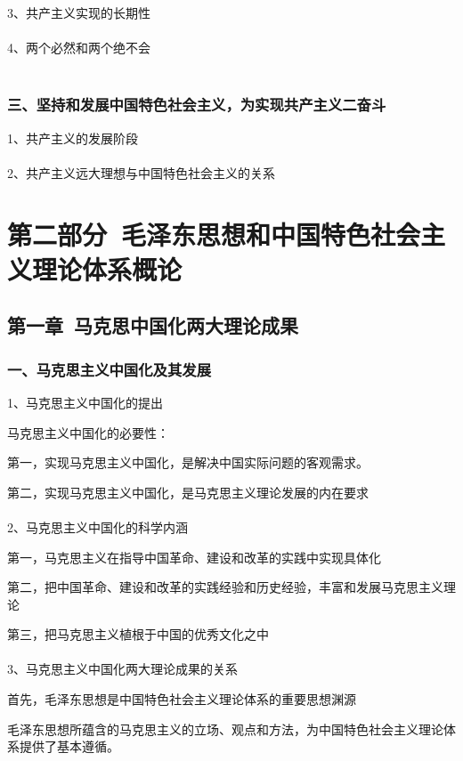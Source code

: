\documentclass{ctexart}
\begin{document}
3、共产主义实现的长期性
\\\\

4、两个必然和两个绝不会
\\\\

\subsubsection{三、坚持和发展中国特色社会主义，为实现共产主义二奋斗}
1、共产主义的发展阶段
\\\\

2、共产主义远大理想与中国特色社会主义的关系





\section{第二部分\ 毛泽东思想和中国特色社会主义理论体系概论}
\subsection{第一章\ 马克思中国化两大理论成果}
\subsubsection{一、马克思主义中国化及其发展}
1、马克思主义中国化的提出

马克思主义中国化的必要性：

第一，实现马克思主义中国化，是解决中国实际问题的客观需求。

第二，实现马克思主义中国化，是马克思主义理论发展的内在要求
\\\\

2、马克思主义中国化的科学内涵

第一，马克思主义在指导中国革命、建设和改革的实践中实现具体化

第二，把中国革命、建设和改革的实践经验和历史经验，丰富和发展马克思主义理论

第三，把马克思主义植根于中国的优秀文化之中
\\\\

3、马克思主义中国化两大理论成果的关系

首先，毛泽东思想是中国特色社会主义理论体系的重要思想渊源

毛泽东思想所蕴含的马克思主义的立场、观点和方法，为中国特色社会主义理论体系提供了基本遵循。
\end{document}

